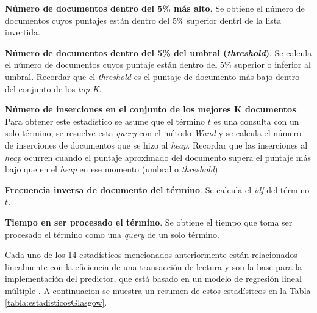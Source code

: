 \begin{list}{}{}
	\item \textbf{Número de documentos dentro del 5\% más alto}. Se obtiene el número de documentos cuyos puntajes están dentro del 5\% superior dentrl de la lista invertida. 
	
	\item \textbf{Número de documentos dentro del 5\% del umbral (\textit{threshold})}. Se calcula el número de documentos cuyos puntaje están dentro del 5\% superior o inferior al umbral. Recordar que el \textit{threshold} es el puntaje de documento más bajo dentro del conjunto de los \textit{top-K}.
	
	\item \textbf{Número de inserciones en el conjunto de los mejores K documentos}. Para obtener este estadístico se asume que el término $t$ es una consulta con un solo término, se resuelve esta \textit{query} con el método \textit{Wand}  y se calcula el número de inserciones de documentos que se hizo al \textit{heap}. Recordar que las inserciones al \textit{heap} ocurren cuando el puntaje aproximado del documento supera el puntaje más bajo que en el \textit{heap} en ese momento (umbral o \textit{threshold}).
	
	\item \textbf{Frecuencia inversa de documento del término}. Se calcula el \textit{idf} del término $t$.
	
	\item \textbf{Tiempo en ser procesado el término}. Se obtiene el tiempo que toma ser procesado el término como una \textit{query} de un solo término.

\end{list}


Cada uno de los 14 estadísticos mencionados anteriormente están relacionados linealmente con la eficiencia de una transacción de lectura y son la base para la implementación del predictor, que está basado en un modelo de regresión lineal múltiple \citep{Chambers:1991}. A continuacion se muestra un resumen de estos estadísitcos en la Tabla \ref{tabla:estadisticosGlasgow}. 

